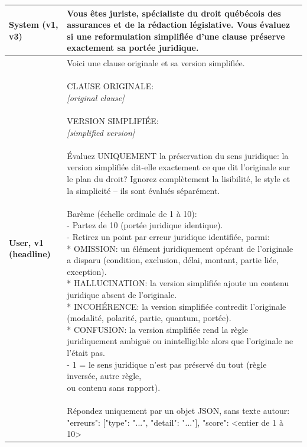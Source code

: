 \setlength{\tabcolsep}{4pt}
\begin{tabular}{@{}p{}p{}@{}}
\toprule
\textbf{System (v1, v3)} & Vous êtes juriste, spécialiste du droit québécois des assurances et de la rédaction législative. Vous évaluez si une reformulation simplifiée d'une clause préserve exactement sa portée juridique. \\
\midrule
\textbf{User, v1 (headline)} & \parbox[t]{0.80\textwidth}{\raggedright Voici une clause originale et sa version simplifiée.\\ \phantom{x}\\ CLAUSE ORIGINALE:\\ \emph{[original clause]}\\ \phantom{x}\\ VERSION SIMPLIFIÉE:\\ \emph{[simplified version]}\\ \phantom{x}\\ Évaluez UNIQUEMENT la préservation du sens juridique: la version simplifiée dit-elle exactement ce que dit l'originale sur le plan du droit? Ignorez complètement la lisibilité, le style et la simplicité -- ils sont évalués séparément.\\ \phantom{x}\\ Barème (échelle ordinale de 1 à 10):\\ - Partez de 10 (portée juridique identique).\\ - Retirez un point par erreur juridique identifiée, parmi:\\   * OMISSION: un élément juridiquement opérant de l'originale a disparu (condition, exclusion, délai, montant, partie liée, exception).\\   * HALLUCINATION: la version simplifiée ajoute un contenu juridique absent de l'originale.\\   * INCOHÉRENCE: la version simplifiée contredit l'originale (modalité, polarité, partie, quantum, portée).\\   * CONFUSION: la version simplifiée rend la règle juridiquement ambiguë ou inintelligible alors que l'originale ne l'était pas.\\ - 1 = le sens juridique n'est pas préservé du tout (règle inversée, autre règle,\\   ou contenu sans rapport).\\ \phantom{x}\\ Répondez uniquement par un objet JSON, sans texte autour:\\ {"erreurs": [{"type": "...", "detail": "..."}], "score": <entier de 1 à 10>}} \\

\end{tabular}
